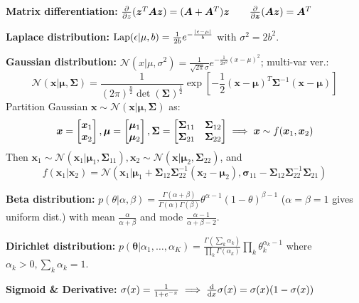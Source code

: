 \documentclass[twocolumn, 8pt]{extarticle}
\begin{document}
\textbf{Matrix differentiation:} \(\frac{\partial}{\partial z}(\bm z^T\bm A\bm z) = (\bm A + \bm A^T)\bm z \qquad \frac{\partial}{\partial\bm z}(\bm A\bm z) = \bm A^T\)

\textbf{Laplace distribution:} \(\operatorname{Lap}(\epsilon | \mu, b) = \frac{1}{2b}e^{-\frac{\lvert\epsilon - \mu\rvert}{b}}\)
with \(\sigma^2 = 2b^2\).

\textbf{Gaussian distribution:} \(\mathcal N(x | \mu, \sigma^2) = \frac{1}{\sqrt{2\pi}\sigma}e^{-\frac{1}{2\sigma^2}(x - \mu)^2}\);
multi-var ver.:
\[
    \mathcal N(\bm x | \bm\mu, \bm\Sigma) = \frac{1}{(2\pi)^\frac{n}{2}\det(\bm\Sigma)^\frac{1}{2}}\exp\left[-\frac{1}{2}(\bm x - \bm \mu)^T\bm \Sigma^{-1}(\bm x - \bm \mu)\right]
\]
Partition Gaussian \(\bm x \sim \mathcal N(\bm x | \bm\mu, \bm\Sigma)\) as:
\[\bm x = \cvec{\bm x_1}{\bm x_2}, \bm\mu = \cvec{\bm\mu _1}{\bm\mu _2}, \bm\Sigma = \mattwo{\bm\Sigma _{11}}{\bm\Sigma _{12}}{\bm\Sigma _{21}}{\bm\Sigma _{22}} \implies \bm x \sim f(\bm x_1, \bm x_2)\]
Then \(\bm x_1 \sim \mathcal N(\bm x_1 | \bm\mu _1, \bm\Sigma _{11}), \bm x_2 \sim \mathcal N(\bm x | \bm\mu _2, \bm\Sigma _{22})\), and
\[f(\bm x_1 | \bm x_2) = \mathcal N(\bm x_1 | \bm\mu _1 + \bm\Sigma _{12}\bm\Sigma _{22}^{-1}(\bm x_2 - \bm\mu _2), \bm\sigma _{11} - \bm\Sigma _{12}\bm\Sigma _{22}^{-1}\bm\Sigma _{21})\]

\textbf{Beta distribution:} \(p(\theta | \alpha, \beta) = \frac{\Gamma(\alpha + \beta)}{\Gamma(\alpha)\Gamma(\beta)}\theta^{\alpha - 1}(1 - \theta)^{\beta - 1}\)
(\(\alpha = \beta = 1\) gives uniform dist.) with mean \(\frac{\alpha}{\alpha + \beta}\) and mode
\(\frac{\alpha - 1}{\alpha + \beta - 2}\).

\textbf{Dirichlet distribution:} \(p(\bm\theta | \alpha _1, \dots, \alpha _K) = \frac{\Gamma\left(\sum _k \alpha _k\right)}{\prod _k \Gamma(\alpha _k)}\prod _k \theta _k^{\alpha _k - 1}\) where \(\alpha _k > 0, \sum _k \alpha _k = 1\).

\textbf{Sigmoid \& Derivative:} \(\sigma(x) = \frac{1}{1 + e^{-x}} \implies \frac{\mathrm{d}}{\mathrm{d}x}\sigma(x) = \sigma(x)(1 - \sigma(x))\)
\end{document}
